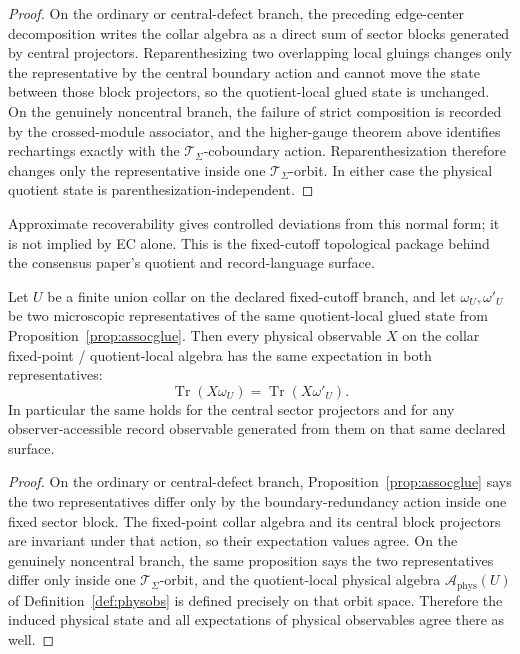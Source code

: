 \begin{proof}
On the ordinary or central-defect branch, the preceding edge-center decomposition writes the
collar algebra as a direct sum of sector blocks generated by central projectors. Reparenthesizing
two overlapping local gluings changes only the representative by the central boundary action and
cannot move the state between those block projectors, so the quotient-local glued state is
unchanged. On the genuinely noncentral branch, the failure of strict composition is recorded by
the crossed-module associator, and the higher-gauge theorem above identifies rechartings exactly
with the \(\mathcal T_\Sigma\)-coboundary action. Reparenthesization therefore changes only the
representative inside one \(\mathcal T_\Sigma\)-orbit. In either case the physical quotient state
is parenthesization-independent.
\end{proof}

\begin{remark}
Approximate recoverability gives controlled deviations from this normal form; it is not implied by
EC alone. This is the fixed-cutoff topological package behind the consensus paper's quotient and
record-language surface.
\end{remark}

\begin{corollary}\label{cor:obsglue}
Let \(U\) be a finite union collar on the declared fixed-cutoff branch, and let
\(\omega_U,\omega'_U\) be two microscopic representatives of the same quotient-local glued state
from Proposition~\ref{prop:assocglue}. Then every physical observable \(X\) on the collar
fixed-point / quotient-local algebra has the same expectation in both representatives:
\[
\operatorname{Tr}(X\omega_U)=\operatorname{Tr}(X\omega'_U).
\]
In particular the same holds for the central sector projectors and for any observer-accessible
record observable generated from them on that same declared surface.
\end{corollary}

\begin{proof}
On the ordinary or central-defect branch, Proposition~\ref{prop:assocglue} says the two
representatives differ only by the boundary-redundancy action inside one fixed sector block. The
fixed-point collar algebra and its central block projectors are invariant under that action, so
their expectation values agree. On the genuinely noncentral branch, the same proposition says the
two representatives differ only inside one \(\mathcal T_\Sigma\)-orbit, and the quotient-local
physical algebra \(\mathcal A_{\mathrm{phys}}(U)\) of Definition~\ref{def:physobs} is defined
precisely on that orbit space. Therefore the induced physical state and all expectations of
physical observables agree there as well.
\end{proof}
